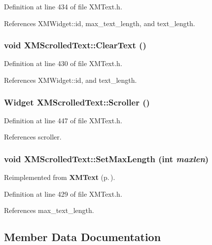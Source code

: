 Definition at line 434 of file XMText.h.

References XMWidget::id, max\_\-text\_\-length, and text\_\-length.
\subsubsection{\setlength{\rightskip}{0pt plus 5cm}void XMScrolled\-Text::Clear\-Text ()\hspace{0.3cm}{\tt  [inline]}}\label{classXMScrolledText_a3}




Definition at line 430 of file XMText.h.

References XMWidget::id, and text\_\-length.
\subsubsection{\setlength{\rightskip}{0pt plus 5cm}Widget XMScrolled\-Text::Scroller ()\hspace{0.3cm}{\tt  [inline]}}\label{classXMScrolledText_a5}




Definition at line 447 of file XMText.h.

References scroller.
\subsubsection{\setlength{\rightskip}{0pt plus 5cm}void XMScrolled\-Text::Set\-Max\-Length (int {\em maxlen})\hspace{0.3cm}{\tt  [inline]}}\label{classXMScrolledText_a2}




Reimplemented from {\bf XMText} {\rm (p.\,\pageref{classXMText_a6})}.

Definition at line 429 of file XMText.h.

References max\_\-text\_\-length.

\subsection{Member Data Documentation}
